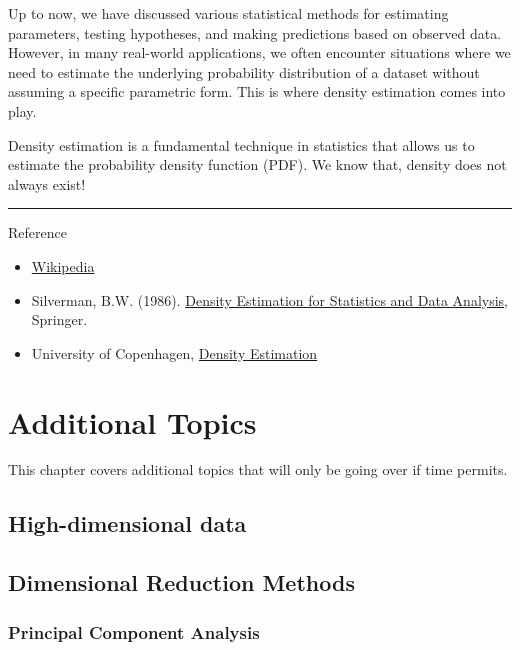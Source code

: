 \documentclass[
  letterpaper,
  DIV=11,
  numbers=noendperiod]{scrreprt}
\begin{document}
Up to now, we have discussed various statistical methods for estimating
parameters, testing hypotheses, and making predictions based on observed
data. However, in many real-world applications, we often encounter
situations where we need to estimate the underlying probability
distribution of a dataset without assuming a specific parametric form.
This is where density estimation comes into play.

Density estimation is a fundamental technique in statistics that allows
us to estimate the probability density function (PDF). We know that,
density does not always exist!

\begin{center}\rule{0.5\linewidth}{0.5pt}\end{center}

Reference

\begin{itemize}
\item
  \href{https://en.wikipedia.org/wiki/Density_estimation}{Wikipedia}
\item
  Silverman, B.W. (1986).
  \href{https://www.amazon.com/Density-Estimation-Statistics-Data-Analysis/dp/0412246201}{Density
  Estimation for Statistics and Data Analysis}, Springer.
\item
  University of Copenhagen,
  \href{https://cswr.nrhstat.org/density}{Density Estimation}
\end{itemize}


\chapter{Additional Topics}\label{additional-topics}

This chapter covers additional topics that will only be going over if
time permits.

\section{High-dimensional data}\label{high-dimensional-data}

\section{Dimensional Reduction
Methods}\label{dimensional-reduction-methods}

\subsection{Principal Component
Analysis}\label{principal-component-analysis}
\end{document}
